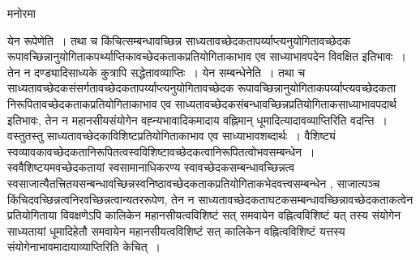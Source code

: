 \documentclass[10pt, openany]{book}
\begin{document}
{\begin{center}   मनोरमा  \end{center}
 येन रूपेणेति~। तथा च किंचित्सम्बन्धावच्छिन्न साध्यतावच्छेदकतापर्य्याप्त्यनुयोगितावच्छेदक रूपावच्छिन्नानुयोगिताकपर्थ्याप्तिकावच्छेदकताकप्रतियोगिताकाभाव एव साध्याभावपदेन विवक्षित इतिभावः~। तेन न दण्ड्यादिसाध्यके कुत्रापि सद्धेतावव्याप्तिः~।  येन सम्बन्धेनेति~। तथा च
साध्यतावच्छेदकसंसर्गतावच्छेदकतापर्य्याप्त्यनुयोगितावच्छेदक रूपावच्छिन्नानुयोगिताकपर्य्याप्त्यवच्छेदकता निरूपितावच्छेदकताकप्रतियोगिताकाभाव एव
साध्यतावच्छेदकसंबन्धावच्छिन्नप्रतियोगिताकसाध्याभावपदार्थ इतिभावः, तेन न महानसीयसंयोगेन वह्न्यभावादिकमादाय वह्निमान् धूमादित्यादावव्याप्तिरिति वदन्ति~। वस्तुतस्तु साध्यतावच्छेदकाविशिष्टप्रतियोगिताकाभाव एव साध्याभावशब्दार्थः~। वैशिष्ट्यं {\qt स्वव्यावकावच्छेदकतानिरूपितत्वस्वविशिष्टावच्छेदकत्वानिरूपितत्वोभवसम्बन्धेन}~। स्ववैशिष्टयमवच्छेदकतायां स्वसामानाधिकरण्य स्वावच्छेदकसम्बन्धावच्छिन्नत्व स्वसाजात्यैतत्त्रितयसन्बन्धावच्छिन्नस्वनिष्ठावच्छेदकताकप्रतियोगिताकभेदवत्त्वसम्बन्धेन , साजात्यञ्च किंचिदवच्छिन्नत्वनिरवच्छिन्नत्वान्यतररूपेण, तेन न साध्यतावच्छेदकताघटकसम्बन्धावच्छिन्नावच्छेदकताकत्वेन प्रतियोगिताया विवक्षणेऽपि कालिकेन महानसीयत्वविशिष्टं सत् समवायेन वह्नित्वविशिष्टं यत् तस्य संयोगेन साध्यतायां धूमादिहेतौ समवायेन महानसीयत्वविशिष्टं सत् कालिकेन वह्नित्वविशिष्टं यत्तस्य संयोगेनाभावमादायाव्याप्तिरिति केचित्~।

}
\end{document}
